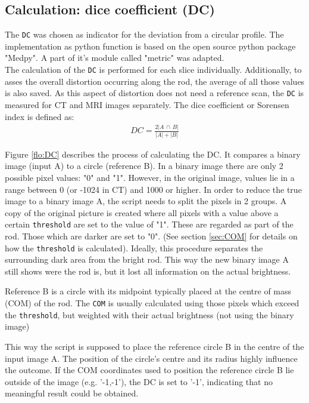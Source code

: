 \subsection{Calculation: dice coefficient (DC)}
\label{sec:DC}

The \texttt{DC} was chosen as indicator for the deviation from a circular profile.
The implementation as python function is based on the open source python package "Medpy". \cite{MedPy} A part of it's module called "metric" was adapted. \cite{MedPy_dc-code}\\


The calculation of the \texttt{DC} is performed for each slice individually.
Additionally, to asses the overall distortion occurring along the rod, the average of all those values is also saved.
As this aspect of distortion does not need a reference scan, the \texttt{DC} is measured for CT and MRI images separately.
The dice coefficient or Sorensen index \cite{MedPy_dc-doc} is defined as:
\begin{align}
\label{eq:DC}
DC = \frac{2 |A \, \cap \, B|}{|A| + |B|}
\end{align}

Figure \ref{flo:DC} describes the process of calculating the DC.
It compares a binary image (input A) to a circle (reference B).
In a binary image there are only 2 possible pixel values: "0" and "1".
However, in the original image, values lie in a range between 0 (or -1024 in CT) and 1000 or higher.
In order to reduce the true image to a binary image A, the script needs to split the pixels in 2 groups.
A copy of the original picture is created where all pixels with a value above a certain  \texttt{threshold} are set to the value of "1".
These are regarded as part of the rod.
Those which are darker are set to "0".
(See section \ref{sec:COM} for details on how the  \texttt{threshold} is calculated).
Ideally, this procedure separates the surrounding dark area from the bright rod.
This way the new binary image A still shows were the rod is, but it lost all information on the actual brightness.

Reference B is a circle with its midpoint typically placed at the centre of mass (COM) of the rod.
The \texttt{COM} is usually calculated using those pixels which exceed the \texttt{threshold}, but weighted with their actual brightness (not using the binary image)

This way the script is supposed to place the reference circle B in the centre of the input image A.
The position of the circle's centre and its radius highly influence the outcome.
If the COM coordinates used to position the reference circle B lie outside of the image (e.g. '-1,-1'), the DC is set to '-1', indicating that no meaningful result could be obtained.

